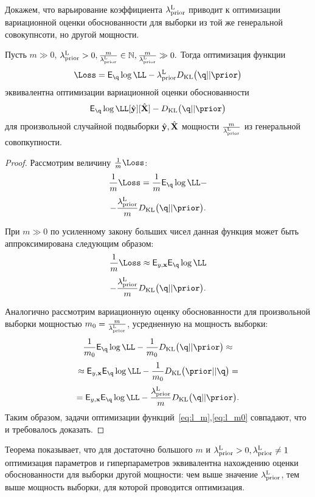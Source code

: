 Докажем, что варьирование коэффициента $\lambda_\text{prior}^\text{L}$ приводит к оптимизации вариационной оценки обоснованности для выборки из той же генеральной совокупнсоти, но другой мощности.
\begin{theorem}
\label{th:elbo_size}
Пусть $m \gg 0$, $\lambda_\text{prior}^\text{L} > 0, \frac{m}{\lambda_\text{prior}^\text{L}}   \in \mathbb{N}, \frac{m}{\lambda_\text{prior}^\text{L}}  \gg 0.$ Тогда оптимизация функции
\[
\Loss = \E_{\q} \log \LL - \lamCL\KL{\q}{\prior}
\]
 эквивалентна оптимизации вариационной оценки обоснованности  $$\E_{\q} \log \LL[\hat{\y}][\hat{\X}] - \KL{\q}{\prior}$$
для произвольной случайной подвыборки $\hat{\mathbf{y}}, \hat{\mathbf{X}}$ мощности $\frac{m}{{\lambda_\text{prior}^\text{L}}}$ из генеральной совопкупности.
\end{theorem}

\begin{proof}
Рассмотрим величину  $\frac{1}{m}\Loss$: \\
\begin{equation}
\label{eq:l_m}
    \frac{1}{m}\Loss = \frac{1}{m}\E_{\q} \log \LL -
\end{equation}
\[
- \frac{\lamCL}{m}\KL{\q}{\prior}.
\]

При $m \gg 0$ по усиленному закону больших чисел данная функция может быть аппроксимирована следующим образом:
\[
    \frac{1}{m}\Loss \approx  \E_{y,\x} \E_{\q} \log \LL 
\]
\[
-\frac{\lamCL}{m}\KL{\q}{\prior}.
\]

Аналогично рассмотрим вариационную оценку обоснованности для произвольной выборки мощностью $m_0 = \frac{m}{\lambda_\text{prior}^\text{L}}$, усредненную на мощность выборки:
\begin{equation}
\label{eq:l_m0}
    \frac{1}{m_0}\E_{\q} \log \LL - \frac{1}{m_0} \KL{\q}{\prior} \approx
\end{equation}
\[
\approx  \E_{y,\x} \E_{\q} \log \LL  -\frac{1}{m_0}\KL{\prior}{\q}= 
\]
\[
= \E_{y,\x} \E_{\q} \log \LL  -\frac{\lamCL}{m}\KL{\q}{\prior}.
\]
Таким образом, задачи оптимизации функций~\eqref{eq:l_m},\eqref{eq:l_m0} совпадают, что и требовалось доказать.
\end{proof}
Теорема показывает, что для достаточно большого $m$ и $\lambda_\text{prior}^\text{L}>0, \lambda_\text{prior}^\text{L} \neq 1$ оптимизация параметров и гиперпараметров эквивалентна нахождению оценки обоснованности для выборки другой мощности: чем выше значение $ \lambda_\text{prior}^\text{L}$, тем выше мощность выборки, для которой проводится оптимизация.



